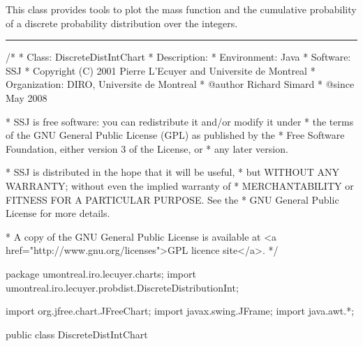 
This class provides tools to plot the mass function and the cumulative
probability of a discrete probability distribution over the integers.


\bigskip\hrule
\begin{code}
\begin{hide}
/*
 * Class:        DiscreteDistIntChart
 * Description:  
 * Environment:  Java
 * Software:     SSJ 
 * Copyright (C) 2001  Pierre L'Ecuyer and Universite de Montreal
 * Organization: DIRO, Universite de Montreal
 * @author       Richard Simard
 * @since        May 2008

 * SSJ is free software: you can redistribute it and/or modify it under
 * the terms of the GNU General Public License (GPL) as published by the
 * Free Software Foundation, either version 3 of the License, or
 * any later version.

 * SSJ is distributed in the hope that it will be useful,
 * but WITHOUT ANY WARRANTY; without even the implied warranty of
 * MERCHANTABILITY or FITNESS FOR A PARTICULAR PURPOSE.  See the
 * GNU General Public License for more details.

 * A copy of the GNU General Public License is available at
   <a href="http://www.gnu.org/licenses">GPL licence site</a>.
 */
\end{hide}
package umontreal.iro.lecuyer.charts;
   import umontreal.iro.lecuyer.probdist.DiscreteDistributionInt;\begin{hide}

import org.jfree.chart.JFreeChart;
import javax.swing.JFrame;
import java.awt.*;
\end{hide}


public class DiscreteDistIntChart \begin{hide} {
   protected DiscreteDistributionInt dist;
   protected int a,b;
   protected XYLineChart cdfChart;
   protected XYLineChart probChart;
\end{hide}\end{code}



